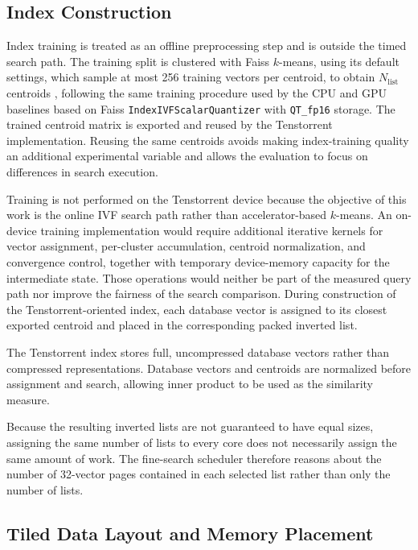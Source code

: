 \subsection{Index Construction}
\label{subsec:index-construction}

Index training is treated as an offline preprocessing step and is outside the timed search path. The training split is clustered with Faiss \(k\)-means, using its default settings, which sample at most 256 training vectors per centroid, to obtain \(N_{\mathrm{list}}\) centroids \cite{faiss}, following the same training procedure used by the CPU and GPU baselines based on Faiss \texttt{IndexIVFScalarQuantizer} with \texttt{QT\_fp16} storage. The trained centroid matrix is exported and reused by the Tenstorrent implementation. Reusing the same centroids avoids making index-training quality an additional experimental variable and allows the evaluation to focus on differences in search execution.

Training is not performed on the Tenstorrent device because the objective of this work is the online IVF search path rather than accelerator-based \(k\)-means. An on-device training implementation would require additional iterative kernels for vector assignment, per-cluster accumulation, centroid normalization, and convergence control, together with temporary device-memory capacity for the intermediate state. Those operations would neither be part of the measured query path nor improve the fairness of the search comparison. During construction of the Tenstorrent-oriented index, each database vector is assigned to its closest exported centroid and placed in the corresponding packed inverted list.

The Tenstorrent index stores full, uncompressed database vectors rather than compressed representations. Database vectors and centroids are normalized before assignment and search, allowing inner product to be used as the similarity measure.

Because the resulting inverted lists are not guaranteed to have equal sizes, assigning the same number of lists to every core does not necessarily assign the same amount of work. The fine-search scheduler therefore reasons about the number of 32-vector pages contained in each selected list rather than only the number of lists.

\subsection{Tiled Data Layout and Memory Placement}
\label{subsec:tiled-list-layout}

